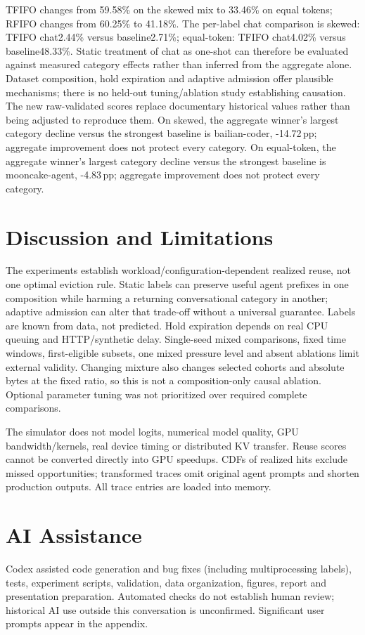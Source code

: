 \documentclass{article}
\begin{document}
TFIFO changes from 59.58\% on the skewed mix to 33.46\% on equal tokens; RFIFO changes from 60.25\% to 41.18\%. The per-label chat comparison is skewed: TFIFO chat2.44\% versus baseline2.71\%; equal-token: TFIFO chat4.02\% versus baseline48.33\%. Static treatment of chat as one-shot can therefore be evaluated against measured category effects rather than inferred from the aggregate alone. Dataset composition, hold expiration and adaptive admission offer plausible mechanisms; there is no held-out tuning/ablation study establishing causation. The new raw-validated scores replace documentary historical values rather than being adjusted to reproduce them. On skewed, the aggregate winner's largest category decline versus the strongest baseline is bailian-coder, -14.72\,pp; aggregate improvement does not protect every category. On equal-token, the aggregate winner's largest category decline versus the strongest baseline is mooncake-agent, -4.83\,pp; aggregate improvement does not protect every category.

\section{Discussion and Limitations}
The experiments establish workload/configuration-dependent realized reuse, not one optimal eviction rule. Static labels can preserve useful agent prefixes in one composition while harming a returning conversational category in another; adaptive admission can alter that trade-off without a universal guarantee. Labels are known from data, not predicted. Hold expiration depends on real CPU queuing and HTTP/synthetic delay. Single-seed mixed comparisons, fixed time windows, first-eligible subsets, one mixed pressure level and absent ablations limit external validity. Changing mixture also changes selected cohorts and absolute bytes at the fixed ratio, so this is not a composition-only causal ablation. Optional parameter tuning was not prioritized over required complete comparisons.

The simulator does not model logits, numerical model quality, GPU bandwidth/kernels, real device timing or distributed KV transfer. Reuse scores cannot be converted directly into GPU speedups. CDFs of realized hits exclude missed opportunities; transformed traces omit original agent prompts and shorten production outputs. All trace entries are loaded into memory.

\section{AI Assistance}
Codex assisted code generation and bug fixes (including multiprocessing labels), tests, experiment scripts, validation, data organization, figures, report and presentation preparation. Automated checks do not establish human review; historical AI use outside this conversation is unconfirmed. Significant user prompts appear in the appendix.
\end{document}

